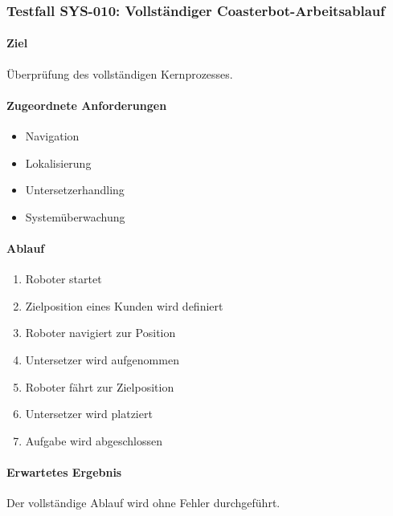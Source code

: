 \documentclass[
  a4paper,
  12pt,
  DIV=12,        %
  parskip=half,  %
  headings=small %
]{scrartcl}
\theoremstyle{definition}
\providecommand{\tightlist}{%
  \setlength{\itemsep}{0pt}\setlength{\parskip}{0pt}}
\theoremstyle{definition}
\begin{document}
\subsubsection{Testfall SYS-010: Vollständiger
Coasterbot-Arbeitsablauf}\label{testfall-sys-010-vollstuxe4ndiger-coasterbot-arbeitsablauf}

\paragraph{Ziel}\label{ziel-33}

Überprüfung des vollständigen Kernprozesses.

\paragraph{Zugeordnete
Anforderungen}\label{zugeordnete-anforderungen-33}

\begin{itemize}
\tightlist
\item
  Navigation
\item
  Lokalisierung
\item
  Untersetzerhandling
\item
  Systemüberwachung
\end{itemize}

\paragraph{Ablauf}\label{ablauf-33}

\begin{enumerate}
\def\labelenumi{\arabic{enumi}.}
\tightlist
\item
  Roboter startet
\item
  Zielposition eines Kunden wird definiert
\item
  Roboter navigiert zur Position
\item
  Untersetzer wird aufgenommen
\item
  Roboter fährt zur Zielposition
\item
  Untersetzer wird platziert
\item
  Aufgabe wird abgeschlossen
\end{enumerate}

\paragraph{Erwartetes Ergebnis}\label{erwartetes-ergebnis-33}

Der vollständige Ablauf wird ohne Fehler durchgeführt.
\end{document}
